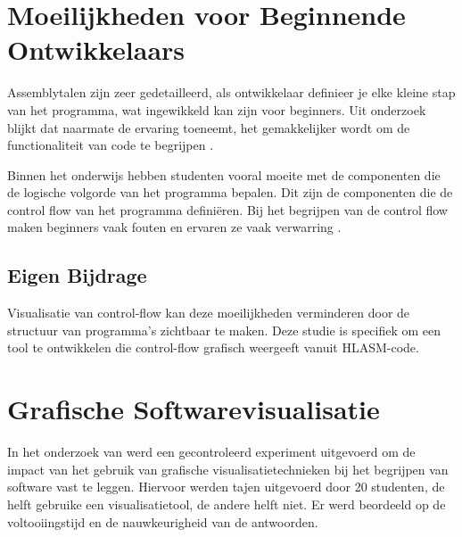 
\section{Moeilijkheden voor Beginnende Ontwikkelaars}

Assemblytalen zijn zeer gedetailleerd, als ontwikkelaar definieer je elke kleine stap van het programma, wat ingewikkeld kan zijn voor beginners. Uit onderzoek blijkt dat naarmate de ervaring toeneemt, het gemakkelijker wordt om de functionaliteit van code te begrijpen \autocite{feigenspan_kästner_liebig_apel_hanenberg_2012}.

Binnen het onderwijs hebben studenten vooral moeite met de componenten die de logische volgorde van het programma bepalen. Dit zijn de componenten die de control flow van het programma definiëren. Bij het begrijpen van de control flow maken beginners vaak fouten en ervaren ze vaak verwarring \autocite{kawash_2024}. 

\subsection{Eigen Bijdrage}

Visualisatie van control-flow kan deze moeilijkheden verminderen door de structuur van programma’s zichtbaar te maken. Deze studie is specifiek om een tool te ontwikkelen die control-flow grafisch weergeeft vanuit HLASM-code.

\section{Grafische Softwarevisualisatie}


In het onderzoek van \textcite{cardenas_aponte_2017} werd een gecontroleerd experiment uitgevoerd om de impact van het gebruik van grafische visualisatietechnieken bij het begrijpen van software vast te leggen. Hiervoor werden tajen uitgevoerd door 20 studenten, de helft gebruike een visualisatietool, de andere helft niet. Er werd beordeeld op de voltooiingstijd en de nauwkeurigheid van de antwoorden. 

